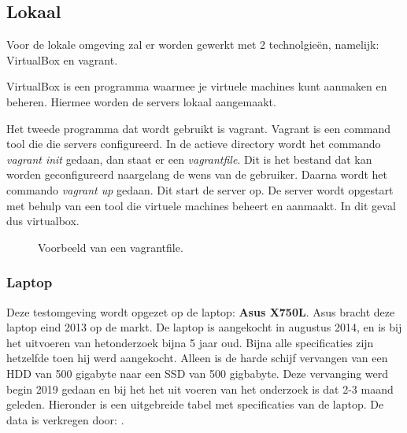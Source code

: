 \subsection{Lokaal}
Voor de lokale omgeving zal er worden gewerkt met 2 technolgieën, namelijk: VirtualBox en vagrant. 

VirtualBox is een programma waarmee je virtuele machines kunt aanmaken en beheren. Hiermee worden de servers lokaal aangemaakt. 

Het tweede programma dat wordt gebruikt is vagrant. Vagrant is een command tool die die servers configureerd. In de actieve directory wordt het commando \textit{vagrant init} gedaan, dan staat er een \textit{vagrantfile}. Dit is het bestand dat kan worden geconfigureerd naargelang de wens van de gebruiker. Daarna wordt het commando \textit{vagrant up} gedaan. Dit start de server op. De server wordt opgestart met behulp van een tool die virtuele machines beheert en aanmaakt. In dit geval dus virtualbox.
\begin{figure}[!htb]
    \caption{Voorbeeld van een vagrantfile.}
    \label{fig:vagrantexamp}
\end{figure}

\newpage
\subsubsection{Laptop}
Deze testomgeving wordt opgezet op de laptop: \textbf{Asus X750L}. Asus bracht deze laptop eind 2013 op de markt. De laptop is aangekocht in augustus 2014, en is bij het uitvoeren van hetonderzoek bijna 5 jaar oud. Bijna alle specificaties zijn hetzelfde toen hij werd aangekocht. Alleen is de harde schijf vervangen van een HDD van 500 gigabyte naar een SSD van 500 gigbabyte. Deze vervanging werd begin 2019 gedaan en bij het het uit voeren van het onderzoek is dat 2-3 maand geleden. Hieronder is een  uitgebreide tabel met specificaties van de laptop. De data is verkregen door: \autocite{asuslaptop}.

